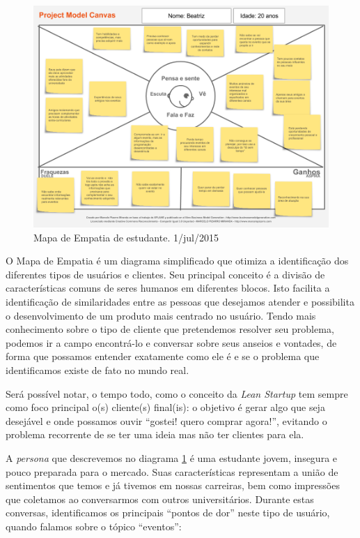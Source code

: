 \documentclass[12pt,a4paper,twoside,hyphens,english,brazil]{abntex2}
\begin{document}
\begin{figure}[!h]
	\centering
	\includegraphics[width=1\linewidth]{diagramas/mapa-de-empatia.png}
	\caption{Mapa de Empatia de estudante. 1/jul/2015}
	\label{diag:empatia}
\end{figure}

O Mapa de Empatia\cite{mapa-de-empatia} é um diagrama simplificado que otimiza a identificação dos diferentes tipos de usuários e clientes. Seu principal conceito é a divisão de características comuns de seres humanos em diferentes blocos. Isto facilita a identificação de similaridades entre as pessoas que desejamos atender e possibilita o desenvolvimento de um produto mais centrado no usuário. Tendo mais conhecimento sobre o tipo de cliente que pretendemos resolver seu problema, podemos ir a campo encontrá-lo e conversar sobre seus anseios e vontades, de forma que possamos entender exatamente como ele é e se o problema que identificamos existe de fato no mundo real.

Será possível notar, o tempo todo, como o conceito da \emph{Lean Startup} tem sempre como foco principal o(s) cliente(s) final(is): o objetivo é gerar algo que seja desejável e onde possamos ouvir ``gostei! quero comprar agora!'', evitando o problema recorrente de se ter uma ideia mas não ter clientes para ela.

A \emph{persona}\footnotemark{} que descrevemos no diagrama \ref{diag:empatia} é uma estudante jovem, insegura e pouco preparada para o mercado. Suas características representam a união de sentimentos que temos e já tivemos em nossas carreiras, bem como impressões que coletamos ao conversarmos com outros universitários. Durante estas conversas, identificamos os principais ``pontos de dor'' neste tipo de usuário, quando falamos sobre o tópico ``eventos'':
\end{document}
